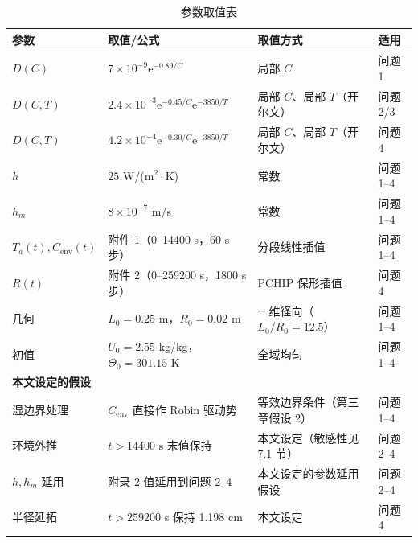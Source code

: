 \documentclass[12pt,a4paper]{ctexart}
\numberwithin{equation}{section}
\begin{document}
\begin{table}[H]
\centering
\caption{参数取值表}
\label{tab:参数}
\small
\setlength{\tabcolsep}{5pt}
\begin{tabular}{llll}
\toprule
参数 & 取值/公式 & 取值方式 & 适用 \\
\midrule
$D(C)$ & $7\times10^{-9}\mathrm e^{-0.89/C}$ & 局部 $C$ & 问题 1 \\
$D(C,T)$ & $2.4\times10^{-3}\mathrm e^{-0.45/C}\mathrm e^{-3850/T}$ & 局部 $C$、局部 $T$（开尔文） & 问题 2/3 \\
$D(C,T)$ & $4.2\times10^{-4}\mathrm e^{-0.30/C}\mathrm e^{-3850/T}$ & 局部 $C$、局部 $T$（开尔文） & 问题 4 \\
$h$ & $25$ W/(m$^2\cdot$K) & 常数 & 问题 1--4 \\
$h_m$ & $8\times10^{-7}$ m/s & 常数 & 问题 1--4 \\
$T_a(t),C_{\mathrm{env}}(t)$ & 附件 1（0--14400 s，60 s 步） & 分段线性插值 & 问题 1--4 \\
$R(t)$ & 附件 2（0--259200 s，1800 s 步） & PCHIP 保形插值 & 问题 4 \\
几何 & $L_0=0.25$ m，$R_0=0.02$ m & 一维径向（$L_0/R_0=12.5$） & 问题 1--4 \\
初值 & $U_0=2.55$ kg/kg，$\varTheta_0=301.15$ K & 全域均匀 & 问题 1--4 \\
\midrule
\multicolumn{4}{l}{\textbf{本文设定的假设}} \\
湿边界处理 & $C_{\mathrm{env}}$ 直接作 Robin 驱动势 & 等效边界条件（第三章假设 2） & 问题 1--4 \\
环境外推 & $t>14400$ s 末值保持 & 本文设定（敏感性见 7.1 节） & 问题 2--4 \\
$h,h_m$ 延用 & 附录 2 值延用到问题 2--4 & 本文设定的参数延用假设 & 问题 2--4 \\
半径延拓 & $t>259200$ s 保持 1.198 cm & 本文设定 & 问题 4 \\
\bottomrule
\end{tabular}
\end{table}
\end{document}
